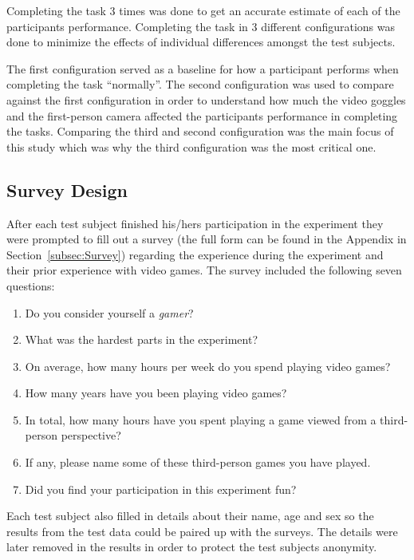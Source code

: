 \documentclass[runningheads,a4paper,oribibl]{llncs}
\begin{document}
Completing the task 3 times was done to get an accurate estimate of each of the participants performance. Completing the task in 3 different configurations was done to minimize the effects of individual differences amongst the test subjects. 

The first configuration served as a baseline for how a participant performs when completing the task ``normally''. The second configuration was used to compare against the first configuration in order to understand how much the video goggles and the first-person camera affected the participants performance in completing the tasks. Comparing the third and second configuration was the main focus of this study which was why the third configuration was the most critical one.















\subsection{Survey Design}
After each test subject finished his/hers participation in the experiment they were prompted to fill out a survey (the full form can be found in the Appendix in Section~\ref{subsec:Survey}) regarding the experience during the experiment and their prior experience with video games. The survey included the following seven questions:
\begin{enumerate}
	\item Do you consider yourself a \emph{gamer}?
	\item What was the hardest parts in the experiment?
	\item On average, how many hours per week do you spend playing video games?
	\item How many years have you been playing video games?
	\item In total, how many hours have you spent playing a game viewed from a third-person perspective?
	\item If any, please name some of these third-person games you have played.
	\item Did you find your participation in this experiment fun?
\end{enumerate}
Each test subject also filled in details about their name, age and sex so the results from the test data could be paired up with the surveys. The details were later removed in the results in order to protect the test subjects anonymity.
\end{document}
